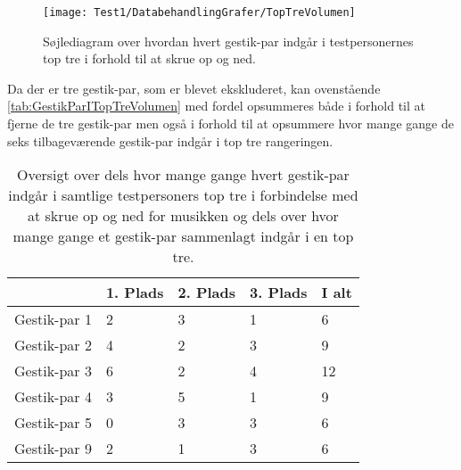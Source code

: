 %
\begin{figure}[H]
	\centering
	\texttt{[image: Test1/DatabehandlingGrafer/TopTreVolumen]}
	\caption{Søjlediagram over hvordan hvert gestik-par indgår i testpersonernes top tre i forhold til at skrue op og ned.}
	\label{fig:SamletTopTreVolumen}
\end{figure}
\noindent
%
Da der er tre gestik-par, som er blevet ekskluderet, kan ovenstående  \autoref{tab:GestikParITopTreVolumen} med fordel opsummeres både i forhold til at fjerne de tre gestik-par men også i forhold til at opsummere hvor mange gange de seks tilbageværende gestik-par indgår i top tre rangeringen. 
%
\begin{table}[H]
	\centering
	\begin{tabular}{ | p{2.4cm} | p{2.4cm} | p{2.4cm} | p{2.4cm} |p{2.4cm}|}
		\hline
		& 1. Plads & 2. Plads & 3. Plads & I alt \\ \hline
		Gestik-par 1 & 2 & 3 & 1 & 6\\ \hline
		Gestik-par 2 & 4 & 2 & 3 & 9\\ \hline
		Gestik-par 3 & 6 & 2 & 4 & 12\\ \hline
		Gestik-par 4 & 3 & 5 & 1 & 9\\ \hline 
		Gestik-par 5 & 0 & 3 & 3 & 6\\ \hline
		Gestik-par 9 & 2 & 1 & 3 & 6\\ \hline
	\end{tabular}
	\caption{Oversigt over dels hvor mange gange hvert gestik-par indgår i samtlige testpersoners top tre i forbindelse med at skrue op og ned for musikken og dels over hvor mange gange et gestik-par sammenlagt indgår i en top tre.}
	\label{tab:GestikParITopTreVolumenOversigt}
\end{table}
\noindent
%
